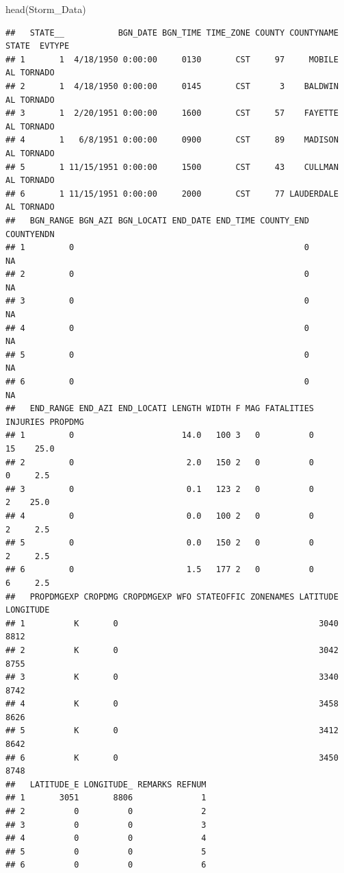 \documentclass[
]{article}
\newenvironment{Shaded}{\begin{snugshade}}{\end{snugshade}}
\newcommand{\FunctionTok}[1]{\textcolor[rgb]{0.00,0.00,0.00}{#1}}
\newcommand{\NormalTok}[1]{#1}
\begin{document}
\begin{Shaded}
\begin{Highlighting}[]
\FunctionTok{head}\NormalTok{(Storm\_Data)}
\end{Highlighting}
\end{Shaded}

\begin{verbatim}
##   STATE__           BGN_DATE BGN_TIME TIME_ZONE COUNTY COUNTYNAME STATE  EVTYPE
## 1       1  4/18/1950 0:00:00     0130       CST     97     MOBILE    AL TORNADO
## 2       1  4/18/1950 0:00:00     0145       CST      3    BALDWIN    AL TORNADO
## 3       1  2/20/1951 0:00:00     1600       CST     57    FAYETTE    AL TORNADO
## 4       1   6/8/1951 0:00:00     0900       CST     89    MADISON    AL TORNADO
## 5       1 11/15/1951 0:00:00     1500       CST     43    CULLMAN    AL TORNADO
## 6       1 11/15/1951 0:00:00     2000       CST     77 LAUDERDALE    AL TORNADO
##   BGN_RANGE BGN_AZI BGN_LOCATI END_DATE END_TIME COUNTY_END COUNTYENDN
## 1         0                                               0         NA
## 2         0                                               0         NA
## 3         0                                               0         NA
## 4         0                                               0         NA
## 5         0                                               0         NA
## 6         0                                               0         NA
##   END_RANGE END_AZI END_LOCATI LENGTH WIDTH F MAG FATALITIES INJURIES PROPDMG
## 1         0                      14.0   100 3   0          0       15    25.0
## 2         0                       2.0   150 2   0          0        0     2.5
## 3         0                       0.1   123 2   0          0        2    25.0
## 4         0                       0.0   100 2   0          0        2     2.5
## 5         0                       0.0   150 2   0          0        2     2.5
## 6         0                       1.5   177 2   0          0        6     2.5
##   PROPDMGEXP CROPDMG CROPDMGEXP WFO STATEOFFIC ZONENAMES LATITUDE LONGITUDE
## 1          K       0                                         3040      8812
## 2          K       0                                         3042      8755
## 3          K       0                                         3340      8742
## 4          K       0                                         3458      8626
## 5          K       0                                         3412      8642
## 6          K       0                                         3450      8748
##   LATITUDE_E LONGITUDE_ REMARKS REFNUM
## 1       3051       8806              1
## 2          0          0              2
## 3          0          0              3
## 4          0          0              4
## 5          0          0              5
## 6          0          0              6
\end{verbatim}
\end{document}
